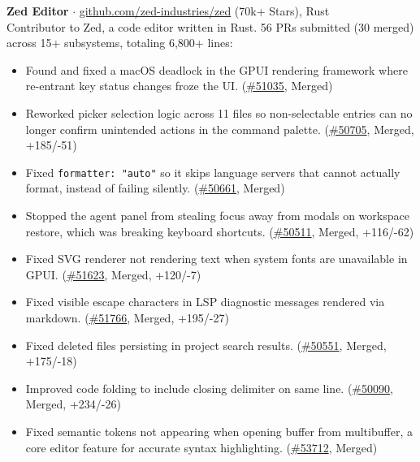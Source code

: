 \documentclass[10pt,a4paper]{article}
\begin{document}
\noindent\textbf{\footnotesize Zed Editor} {\footnotesize $\cdot$ \href{https://github.com/zed-industries/zed}{github.com/zed-industries/zed} (70k+ Stars), Rust}\\
{\footnotesize Contributor to Zed, a code editor written in Rust. 56 PRs submitted (30 merged) across 15+ subsystems, totaling 6,800+ lines:}
\begin{itemize}
    \item {\footnotesize Found and fixed a macOS deadlock in the GPUI rendering framework where re-entrant key status changes froze the UI. (\href{https://github.com/zed-industries/zed/pull/51035}{\#51035}, Merged)}
    \item {\footnotesize Reworked picker selection logic across 11 files so non-selectable entries can no longer confirm unintended actions in the command palette. (\href{https://github.com/zed-industries/zed/pull/50705}{\#50705}, Merged, +185/-51)}
    \item {\footnotesize Fixed \texttt{formatter: "auto"} so it skips language servers that cannot actually format, instead of failing silently. (\href{https://github.com/zed-industries/zed/pull/50661}{\#50661}, Merged)}
    \item {\footnotesize Stopped the agent panel from stealing focus away from modals on workspace restore, which was breaking keyboard shortcuts. (\href{https://github.com/zed-industries/zed/pull/50511}{\#50511}, Merged, +116/-62)}
    \item {\footnotesize Fixed SVG renderer not rendering text when system fonts are unavailable in GPUI. (\href{https://github.com/zed-industries/zed/pull/51623}{\#51623}, Merged, +120/-7)}
    \item {\footnotesize Fixed visible escape characters in LSP diagnostic messages rendered via markdown. (\href{https://github.com/zed-industries/zed/pull/51766}{\#51766}, Merged, +195/-27)}
    \item {\footnotesize Fixed deleted files persisting in project search results. (\href{https://github.com/zed-industries/zed/pull/50551}{\#50551}, Merged, +175/-18)}
    \item {\footnotesize Improved code folding to include closing delimiter on same line. (\href{https://github.com/zed-industries/zed/pull/50090}{\#50090}, Merged, +234/-26)}
    \item {\footnotesize Fixed semantic tokens not appearing when opening buffer from multibuffer, a core editor feature for accurate syntax highlighting. (\href{https://github.com/zed-industries/zed/pull/53712}{\#53712}, Merged)}

\end{itemize}
\end{document}
